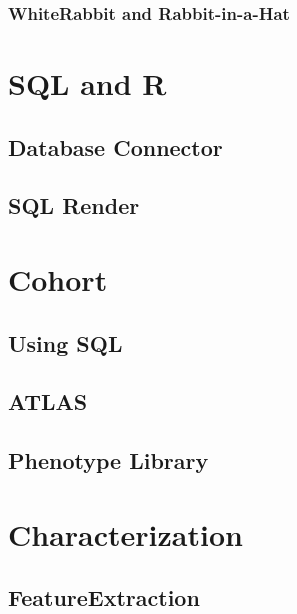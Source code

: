 \documentclass[]{book}
\begin{document}
\subsection{WhiteRabbit and
Rabbit-in-a-Hat}\label{whiterabbit-and-rabbit-in-a-hat}

\subsection{}\label{section}

\chapter{SQL and R}\label{sql-and-r}

\section{Database Connector}\label{database-connector}

\section{SQL Render}\label{sql-render}

\chapter{Cohort}\label{cohort}

\section{Using SQL}\label{using-sql}

\section{ATLAS}\label{atlas}

\section{Phenotype Library}\label{phenotype-library}

\chapter{Characterization}\label{characterization}

\section{FeatureExtraction}\label{featureextraction}
\end{document}
